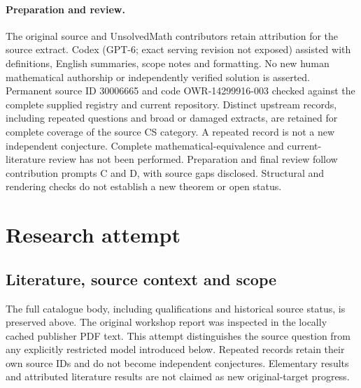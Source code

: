 \documentclass[11pt]{article}
\begin{document}
\paragraph{Preparation and review.}
The original source and UnsolvedMath contributors retain attribution for the source extract. Codex (GPT-6; exact serving revision not exposed) assisted with definitions, English summaries, scope notes and formatting. No new human mathematical authorship or independently verified solution is asserted. Permanent source ID 30006665 and code OWR-14299916-003 checked against the complete supplied registry and current repository. Distinct upstream records, including repeated questions and broad or damaged extracts, are retained for complete coverage of the source CS category. A repeated record is not a new independent conjecture. Complete mathematical-equivalence and current-literature review has not been performed. Preparation and final review follow contribution prompts C and D, with source gaps disclosed. Structural and rendering checks do not establish a new theorem or open status.
\label{end:30006665}

\section{Research attempt}
\subsection{Literature, source context and scope}
The full catalogue body, including qualifications and historical source status, is preserved above. The original workshop report was inspected in the locally cached publisher PDF text. This attempt distinguishes the source question from any explicitly restricted model introduced below. Repeated records retain their own source IDs and do not become independent conjectures. Elementary results and attributed literature results are not claimed as new original-target progress.
\end{document}

